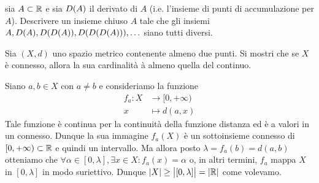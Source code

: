 \begin{es}
  sia $ A \subset \mathbb{R} $ e sia $ D{(A)} $ il derivato di $ A $ (i.e. l'insieme di punti di accumulazione per $ A $). Descrivere un insieme chiuso $ A $ tale che gli insiemi $ A, D{(A)}, D{(D{(A)})}, D{(D{(D{(A)})})}, \ldots $ siano tutti diversi.
\end{es}


\begin{es}
  Sia $ (X, d) $ uno spazio metrico contenente almeno due punti. Si mostri che se $ X $ è connesso, allora la sua cardinalità à almeno quella del continuo.
\end{es}
%
Siano $ a, b \in X $ con $ a \neq b $ e consideriamo la funzione
\begin{align*}
  f_a \colon X & \to [0, +\infty) \\
  x & \mapsto d(a, x)
\end{align*}
Tale funzione è continua per la continuità della funzione distanza ed è a valori in un connesso. Dunque la sua immagine $ f_a(X) $ è un sottoinsieme connesso di $ [0, +\infty) \subset \mathbb{R} $ e quindi un intervallo. Ma allora posto $ \lambda = f_a(b) = d(a, b) $ otteniamo che $ \forall \alpha \in [0, \lambda], \exists x \in X : f_a(x) = \alpha $ o, in altri termini, $ f_a $ mappa $ X $ in $ [0, \lambda] $ in modo suriettivo. Dunque $ \left|X\right| \geq \left|[0, \lambda]\right| = \left|\mathbb{R}\right| $ come volevamo.